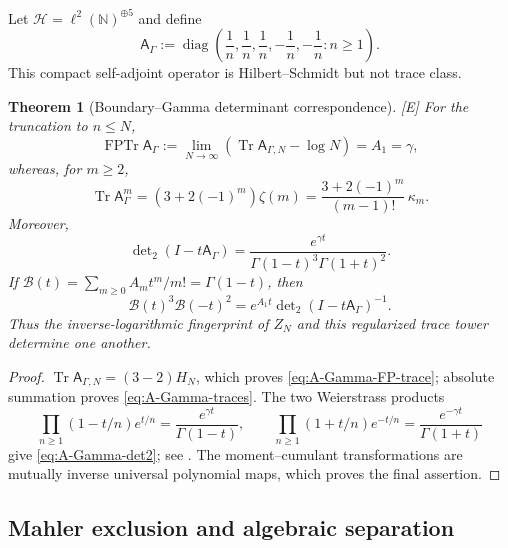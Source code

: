 \documentclass[11pt]{article}
\newtheorem{theorem}{Theorem}[section]
\theoremstyle{definition}
\theoremstyle{remark}
\newcommand{\status}[1]{\textnormal{\textcolor{accent}{\footnotesize[#1]}}}
\DeclareMathOperator{\Tr}{Tr}
\DeclareMathOperator{\FPTr}{FPTr}
\begin{document}
Let $\mathcal H=\ell^2(\mathbb N)^{\oplus5}$ and define
\begin{equation}\label{eq:A-Gamma}
 \mathsf A_\Gamma:=
 \operatorname{diag}\left(
 \frac1n,\frac1n,\frac1n,-\frac1n,-\frac1n:n\ge1\right).
\end{equation}
This compact self-adjoint operator is Hilbert--Schmidt but not trace class.

\begin{theorem}[Boundary--Gamma determinant correspondence]
\label{thm:boundary-Gamma-determinant}
\status{E}
For the truncation to $n\le N$,
\begin{equation}\label{eq:A-Gamma-FP-trace}
 \FPTr\mathsf A_\Gamma:=
 \lim_{N\to\infty}(\Tr\mathsf A_{\Gamma,N}-\log N)=A_1=\gamma,
\end{equation}
whereas, for $m\ge2$,
\begin{equation}\label{eq:A-Gamma-traces}
 \Tr\mathsf A_\Gamma^m=(3+2(-1)^m)\zeta(m)
 =\frac{3+2(-1)^m}{(m-1)!}\,\kappa_m.
\end{equation}
Moreover,
\begin{equation}\label{eq:A-Gamma-det2}
 \det\nolimits_2(I-t\mathsf A_\Gamma)
 =\frac{e^{\gamma t}}{\Gamma(1-t)^3\Gamma(1+t)^2}.
\end{equation}
If $\mathcal B(t)=\sum_{m\ge0}A_mt^m/m!=\Gamma(1-t)$, then
\begin{equation}\label{eq:boundary-det-correspondence}
 \mathcal B(t)^3\mathcal B(-t)^2
 =e^{A_1t}\det\nolimits_2(I-t\mathsf A_\Gamma)^{-1}.
\end{equation}
Thus the inverse-logarithmic fingerprint of $Z_N$ and this regularized trace tower
determine one another.
\end{theorem}

\begin{proof}
$\Tr\mathsf A_{\Gamma,N}=(3-2)H_N$, which proves
\eqref{eq:A-Gamma-FP-trace}; absolute summation proves
\eqref{eq:A-Gamma-traces}.  The two Weierstrass products
\[
 \prod_{n\ge1}(1-t/n)e^{t/n}=\frac{e^{\gamma t}}{\Gamma(1-t)},
 \qquad
 \prod_{n\ge1}(1+t/n)e^{-t/n}=\frac{e^{-\gamma t}}{\Gamma(1+t)}
\]
give \eqref{eq:A-Gamma-det2}; see \cite{SimonTraceIdeals}.  The
moment--cumulant transformations are mutually inverse universal polynomial maps, which
proves the final assertion.
\end{proof}

\subsection{Mahler exclusion and algebraic separation}
\end{document}
